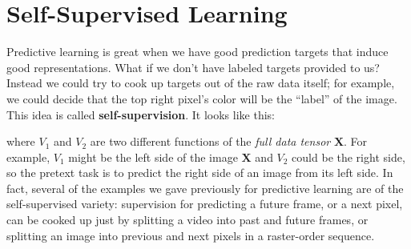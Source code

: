 \section{Self-Supervised Learning}
Predictive learning is great when we have good prediction targets that induce good representations. What if we don't have labeled targets provided to us? Instead we could try to cook up targets out of the raw data itself; for example, we could decide that the top right pixel's color will be the ``label'' of the image. This idea is called \textbf{self-supervision}. It looks like this:
\begin{center}
\end{center}
where $V_1$ and $V_2$ are two different functions of the \textit{full data tensor} $\mathbf{X}$. For example, $V_1$ might be the left side of the image $\mathbf{X}$ and $V_2$ could be the right side, so the pretext task is to predict the right side of an image from its left side. In fact, several of the examples we gave previously for predictive learning are of the self-supervised variety: supervision for predicting a future frame, or a next pixel, can be cooked up just by splitting a video into past and future frames, or splitting an image into previous and next pixels in a raster-order sequence.

